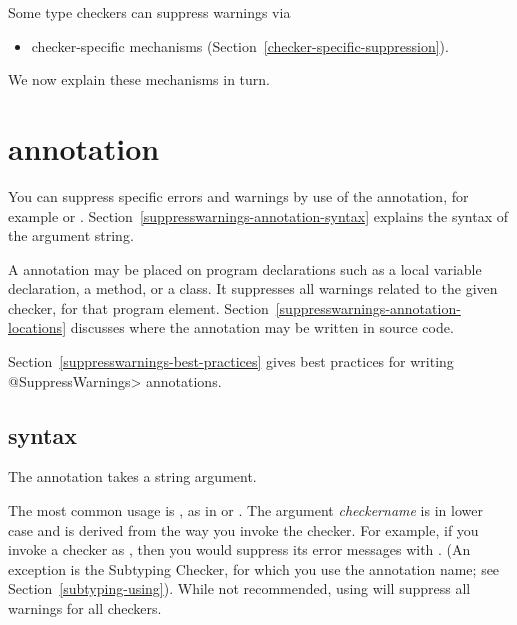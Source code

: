 Some type checkers can suppress warnings via
\begin{itemize}
\item
  checker-specific mechanisms (Section~\ref{checker-specific-suppression}).
\end{itemize}

\noindent
We now explain these mechanisms in turn.


\section{ annotation\label{suppresswarnings-annotation}}

\begin{sloppypar}
You can suppress specific errors and warnings by use of the
 annotation, for example
 or .
Section~\ref{suppresswarnings-annotation-syntax} explains the syntax of the
argument string.
\end{sloppypar}

A 
annotation may be placed on program declarations such as a local
variable declaration, a method, or a class.  It suppresses all warnings
related to the given checker, for that program element.
Section~\ref{suppresswarnings-annotation-locations} discusses where the
annotation may be written in source code.

Section~\ref{suppresswarnings-best-practices} gives best practices for
writing \<@SuppressWarnings> annotations.


\subsection{ syntax\label{suppresswarnings-annotation-syntax}}

The  annotation takes a string argument.

The most common usage is , as
in  or
.  The argument \emph{checkername} is
in lower case and is derived from the way you invoke the checker.  For
example, if you invoke a checker as
,
then you would suppress its error messages with
.  (An exception is the Subtyping
Checker, for which you use the annotation name; see
Section~\ref{subtyping-using}).  While not recommended, using
 will suppress all warnings for all
checkers.


